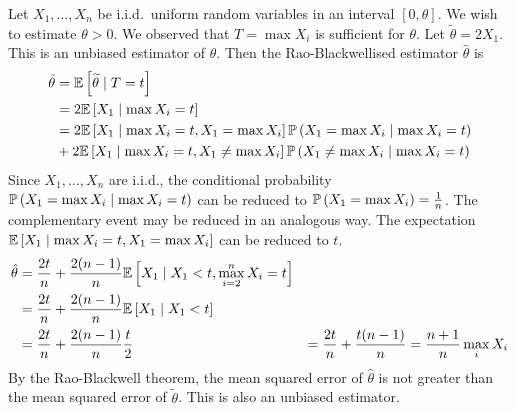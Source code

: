 \begin{example}
	Let \( X_1, \dots, X_n \) be i.i.d.\ uniform random variables in an interval \( [0, \theta] \).
	We wish to estimate \( \theta > 0 \).
	We observed that \( T = \max X_i \) is sufficient for \( \theta \).
	Let \( \widetilde \theta = 2 X_1 \).
	This is an unbiased estimator of \( \theta \).
	Then the Rao-Blackwellised estimator \( \hat \theta \) is
	\begin{align*}
		\hat \theta &= \mathbb{E}\left[{\widetilde \theta \mid T = t}\right] \\
		&= 2 \mathbb{E}\left[{X_1 \mid \max X_i = t}\right] \\
		&= 2 \mathbb{E}\left[{X_1 \mid \max X_i = t, X_1 = \max X_i}\right] \mathbb{P}\left({X_1 = \max X_i \mid \max X_i = t}\right) \\
		&+ 2 \mathbb{E}\left[{X_1 \mid \max X_i = t, X_1 \neq \max X_i}\right] \mathbb{P}\left({X_1 \neq \max X_i \mid \max X_i = t}\right) \\
	\end{align*}
	Since \( X_1, \dots, X_n \) are i.i.d., the conditional probability \( \mathbb{P}\left({X_1 = \max X_i \mid \max X_i = t}\right) \) can be reduced to \( \mathbb{P}\left({X_1 = \max X_i}\right) = \frac{1}{n} \).
	The complementary event may be reduced in an analogous way.
	The expectation \( \mathbb{E}\left[{X_1 \mid \max X_i = t, X_1 = \max X_i}\right] \) can be reduced to \( t \).
	\begin{align*}
		\hat \theta &= \frac{2t}{n} + \frac{2(n-1)}{n} \mathbb{E}\left[{X_1 \mid X_1 < t, \max_{i=2}^n X_i = t}\right] \\
		&= \frac{2t}{n} + \frac{2(n-1)}{n} \mathbb{E}\left[{X_1 \mid X_1 < t}\right] \\
		&= \frac{2t}{n} + \frac{2(n-1)}{n} \frac{t}{2}
		&= \frac{2t}{n} + \frac{t(n-1)}{n} = \frac{n+1}{n} \max_i X_i
	\end{align*}
	By the Rao-Blackwell theorem, the mean squared error of \( \hat \theta \) is not greater than the mean squared error of \( \widetilde \theta \).
	This is also an unbiased estimator.
\end{example}

